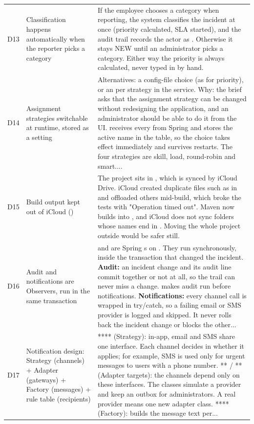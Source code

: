 \begin{longtable}{@{}L{0.9cm}L{4.3cm}L{10cm}@{}}
D13 & Classification happens automatically when the reporter picks a category & If the employee chooses a category when reporting, the system classifies the incident at once (priority calculated, SLA started), and the audit trail records the actor as . Otherwise it stays NEW until an administrator picks a category. Either way the priority is always calculated, never typed in by hand. \\
D14 & Assignment strategies switchable at runtime, stored as a setting & Alternatives: a config-file choice (as for priority), or an  per strategy in the service. Why: the brief asks that the assignment strategy can be changed without redesigning the application, and an administrator should be able to do it from the UI.  receives every  from Spring and stores the active name in the  table, so the choice takes effect immediately and survives restarts. The four strategies are skill, load, round-robin and smart.... \\
D15 & Build output kept out of iCloud () & The project sits in , which is synced by iCloud Drive. iCloud created duplicate files such as  in  and offloaded others mid-build, which broke the tests with "Operation timed out". Maven now builds into , and iCloud does not sync folders whose names end in . Moving the whole project outside  would be safer still. \\
D16 & Audit and notifications are Observers, run in the same transaction &  and  are Spring s on . They run synchronously, inside the transaction that changed the incident. \textbf{Audit:} an incident change and its audit line commit together or not at all, so the trail can never miss a change.  makes audit run before notifications. \textbf{Notifications:} every channel call is wrapped in try/catch, so a failing email or SMS provider is logged and skipped. It never rolls back the incident change or blocks the other... \\
D17 & Notification design: Strategy (channels) + Adapter (gateways) + Factory (messages) + rule table (recipients) & **** (Strategy): in-app, email and SMS share one interface. Each channel decides in  whether it applies; for example, SMS is used only for urgent messages to users with a phone number. ** / ** (Adapter targets): the channels depend only on these interfaces. The  classes simulate a provider and keep an outbox for administrators. A real provider means one new adapter class. **** (Factory): builds the message text per... \\

\end{longtable}
